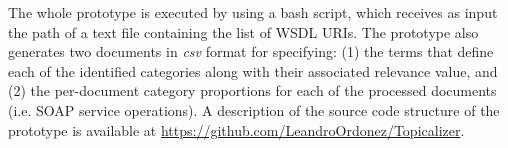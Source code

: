 The whole prototype is executed by using a bash script, which receives as input the path of a text file containing the list of WSDL URIs. The prototype also generates two documents in \emph{csv} format for specifying: (1) the terms that define each of the identified categories along with their associated relevance value, and (2) the per-document category proportions for each of the processed documents (i.e. SOAP service operations).  
A description of the source code structure of the prototype is available at \href{https://github.com/LeandroOrdonez/Topicalizer}{https://github.com/LeandroOrdonez/Topicalizer}.